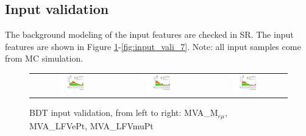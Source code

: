 \subsection{Input validation}
The background modeling of the input features are checked in SR. The input features are shown in Figure \ref{fig:input_vali_1}-\ref{fig:input_vali_7}. Note: all input samples come from MC simulation.
\begin{figure}[tbh!]
 \begin{center}
 \begin{tabular}{ccc}
  \includegraphics[width=0.325\textwidth]{figures/Part3/BDT/Memu}&
    \includegraphics[width=0.325\textwidth]{figures/Part3/BDT/LFVePt}&
  \includegraphics[width=0.325\textwidth]{figures/Part3/BDT/LFVmuPt}\\
 \end{tabular}
 \caption{BDT input validation, from left to right: MVA\_M$_{e\mu}$, MVA\_LFVePt, MVA\_LFVmuPt}
 \label{fig:input_vali_1}
 \end{center}
\end{figure}

